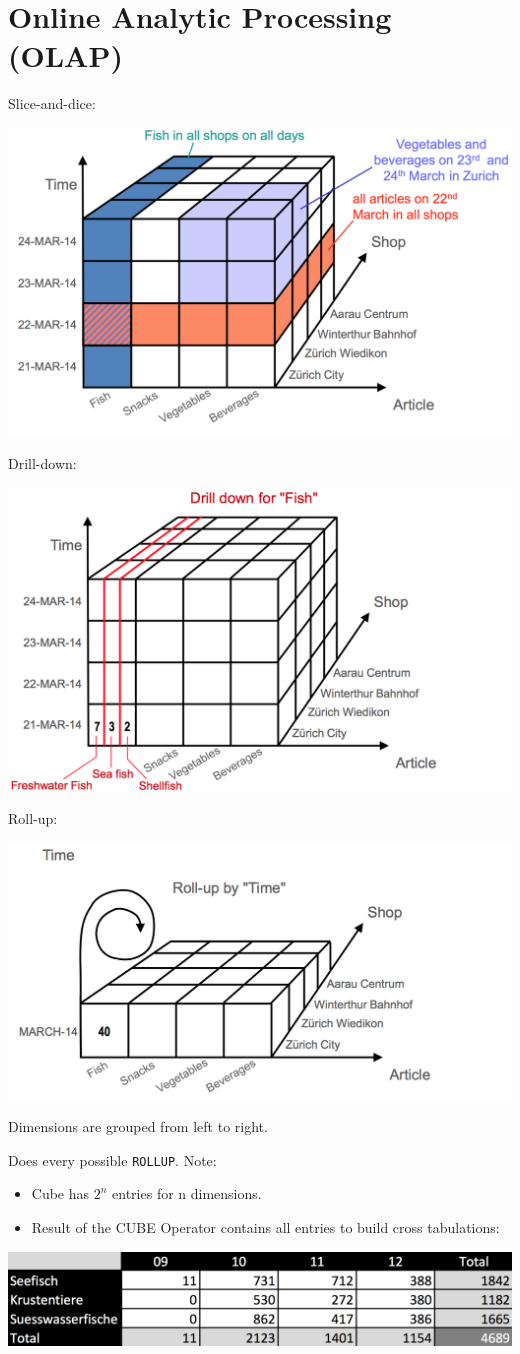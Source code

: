 
\section{Online Analytic Processing (OLAP)}

\begin{breakbox}
\newline Slice-and-dice:
\begin{center}
\includegraphics[width=.1\textwidth]{slides_images/slice_and_dice}
\end{center}
Drill-down:
\begin{center}
\includegraphics[width=.1\textwidth]{slides_images/drill_down}
\end{center}
Roll-up:
\begin{center}
\includegraphics[width=.1\textwidth]{slides_images/roll_up}
\end{center}
\end{breakbox}

\begin{breakbox}
Dimensions are grouped from left to right.
\end{breakbox}

\begin{breakbox}
Does every possible \lstinline{ROLLUP}.
Note:
\begin{itemize}
	\item Cube has $2^n$ entries for n dimensions.
	\item Result of the CUBE Operator contains all entries to build cross tabulations:
\end{itemize}
\begin{center}
\includegraphics[width=.15\textwidth]{slides_images/cross_tabulation}
\end{center}
\end{breakbox}

